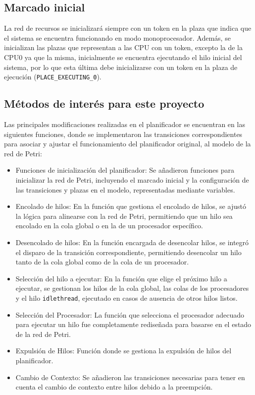 \subsection{Marcado inicial}
La red de recursos se inicializará siempre con un token en la plaza que indica que el sistema se encuentra funcionando en modo monoprocesador. Además, se inicializan las plazas que representan a las CPU con un token, excepto la de la CPU0 ya que la misma, inicialmente se encuentra ejecutando el hilo inicial del sistema, por lo que esta última debe inicializarse con un token en la plaza de ejecución (\verb|PLACE_EXECUTING_0|).

\subsection{Métodos de interés para este proyecto}

Las principales modificaciones realizadas en el planificador se encuentran en las siguientes funciones, donde se implementaron las transiciones correspondientes para asociar y ajustar el funcionamiento del planificador original, al modelo de la red de Petri:

\begin{itemize}
    \item Funciones de inicialización del planificador: Se añadieron funciones para inicializar la red de Petri, incluyendo el marcado inicial y la configuración de las transiciones y plazas en el modelo, representadas mediante variables.
    \item Encolado de hilos: En la función que gestiona el encolado de hilos, se ajustó la lógica para alinearse con la red de Petri, permitiendo que un hilo sea encolado en la cola global o en la de un procesador específico.
    \item Desencolado de hilos: En la función encargada de desencolar hilos, se integró el disparo de la transición correspondiente, permitiendo desencolar un hilo tanto de la cola global como de la cola de un procesador.
    \item Selección del hilo a ejecutar: En la función que elige el próximo hilo a ejecutar, se gestionan los hilos de la cola global, las colas de los procesadores y el hilo \texttt{idlethread}, ejecutado en casos de ausencia de otros hilos listos.
    \item Selección del Procesador: La función que selecciona el procesador adecuado para ejecutar un hilo fue completamente rediseñada para basarse en el estado de la red de Petri.
    \item Expulsión de Hilos: Función donde se gestiona la expulsión de hilos del planificador.
    \item Cambio de Contexto: Se añadieron las transiciones necesarias para tener en cuenta el cambio de contexto entre hilos debido a la preempción.
\end{itemize}
